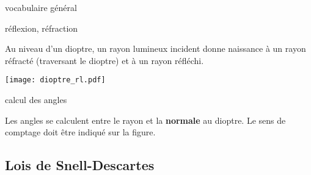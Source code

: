 \documentclass[../main/main.tex]{subfiles}
\begin{document}
\begin{tcbraster}[raster columns=2, raster equal height=rows]
\begin{tcolorbox}[blankest, raster multicolumn=1, space to=\myspace]
\begin{tcbraster}[raster columns=1]
\begin{nota}[label=nota:descartes]{vocabulaire général}
\begin{itemize}
                \end{itemize}
            \end{nota}
        \end{tcbraster}
    \end{tcolorbox}
    \begin{tcolorbox}[blankest, raster multicolumn=1]
        \begin{tcbraster}[raster columns=1]
            \begin{prop}[label=prop:r_dioptre]{{réflexion, réfraction}}

                Au niveau d'un dioptre, un rayon lumineux incident donne
                naissance à un rayon réfracté (traversant le dioptre) et à un
                rayon réfléchi.

                \tcblower

                \begin{center}
                    \texttt{[image: dioptre\_rl.pdf]}


                    \label{fig:dioptre_rl}
                \end{center}

            \end{prop}
            \begin{ror}[label=ror:normale, valign=center]{calcul des angles}

                \Huge Les angles se calculent entre le rayon et la
                \textbf{normale} au dioptre. Le sens de comptage doit être
                indiqué sur la figure.

            \end{ror}
        \end{tcbraster}
    \end{tcolorbox}
\end{tcbraster}

\subsection{Lois de Snell-Descartes}
\end{document}
